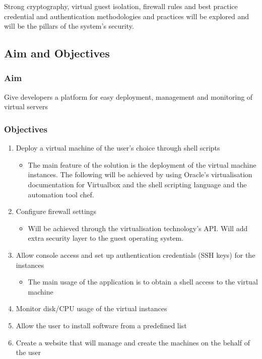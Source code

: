 \documentclass{article}
\begin{document}
   Strong cryptography, virtual guest isolation, firewall rules and best practice credential and authentication methodologies and practices will be explored and will be the pillars of the system's security.
  \subsection{Aim and Objectives}
	  \subsubsection{Aim}
	  Give developers a platform for easy deployment, management and monitoring of virtual servers
	  \subsubsection{Objectives}
	  
	  \begin{enumerate}
	  	\item Deploy a virtual machine of the user's choice through shell scripts
		  	\begin{itemize}
		  		\item The main feature of the solution is the deployment of the virtual machine instances. The following will be achieved by using Oracle's virtualisation documentation for Virtualbox and the shell scripting language and the automation tool chef.
		    \end{itemize}

	  	\item Configure firewall settings
		  	\begin{itemize}
		  		\item Will be achieved through the virtualisation technology's API. Will add extra security layer to the guest operating system.
		  	\end{itemize}

	  	\item Allow console access and set up authentication credentials (SSH keys) for the instances
		  	\begin{itemize}
		  		\item The main usage of the application is to obtain a shell access to the virtual machine
		  	\end{itemize}
	  	\item Monitor disk/CPU usage of the virtual instances
	  	\item Allow the user to install software from a predefined list
	  	\item Create a website that will manage and create the machines on the behalf of the user 	
	  \end{enumerate}
\end{document}
